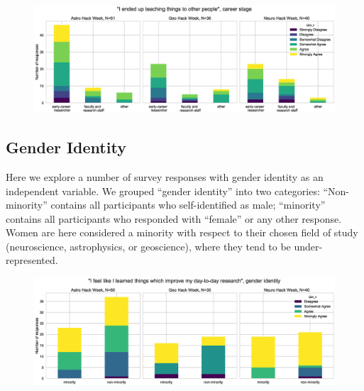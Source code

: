 \documentclass{aastex62}
\begin{document}
\begin{figure}[h!]
\centering
\includegraphics[width=\textwidth]{Q23_2_Q3_stackedbars.eps}
\caption{}
\label{fig:corr4}
\end{figure}

\clearpage

\subsection{Gender Identity}

Here we explore a number of survey responses with gender identity as an independent variable. We grouped ``gender identity'' into two categories: ``Non-minority'' contains all participants who self-identified as male; ``minority'' contains all participants who responded with ``female'' or any other response. Women are here considered a minority with respect to their chosen field of study (neuroscience, astrophysics, or geoscience), where they tend to be under-represented.


\begin{figure}[h!]
\centering
\includegraphics[width=\textwidth]{Q24_4_Q27_stackedbars.eps}
\caption{}
\label{fig:corr5}
\end{figure}
\end{document}
